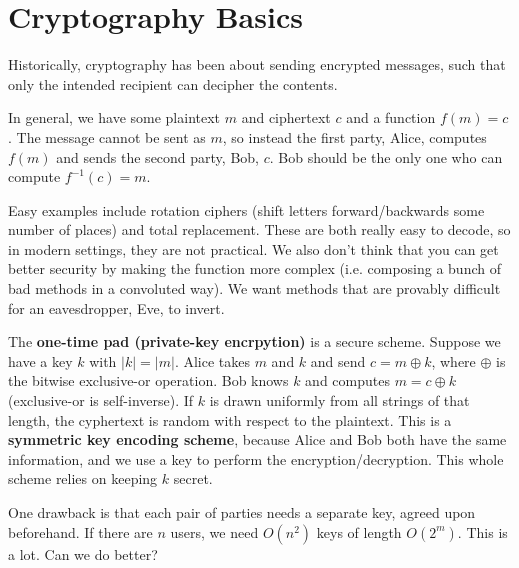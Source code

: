 







\section*{Cryptography Basics}


Historically, cryptography has been about sending encrypted messages, such that only the intended recipient can decipher the contents.

In general, we have some plaintext $m$ and ciphertext $c$ and a function $f(m)=c$.  The message cannot be sent as $m$, so instead the first party, Alice, computes $f(m)$ and sends the second party, Bob, $c$.  Bob should be the only one who can compute $f^{-1}(c)=m$.

Easy examples include rotation ciphers (shift letters forward/backwards some number of places) and total replacement.  These are both really easy to decode, so in modern settings, they are not practical.  We also don't think that you can get better security by making the function more complex (i.e. composing a bunch of bad methods in a convoluted way).  We want methods that are provably difficult for an eavesdropper, Eve, to invert.

The \textbf{one-time pad (private-key encrpytion)} is a secure scheme.  Suppose we have a key $k$ with $|k|=|m|$.  Alice takes $m$ and $k$ and send $c=m\oplus k$, where $\oplus$ is the bitwise exclusive-or operation.  Bob knows $k$ and computes $m=c\oplus k$ (exclusive-or is self-inverse).  If $k$ is drawn uniformly from all strings of that length, the cyphertext is random with respect to the plaintext.  This is a \textbf{symmetric key encoding scheme}, because Alice and Bob both have the same information, and we use a key to perform the encryption/decryption.  This whole scheme relies on keeping $k$ secret.

One drawback is that each pair of parties needs a separate key, agreed upon beforehand.  If there are $n$ users, we need $O(n^2)$ keys of length $O(2^m)$.  This is a lot.  Can we do better?

